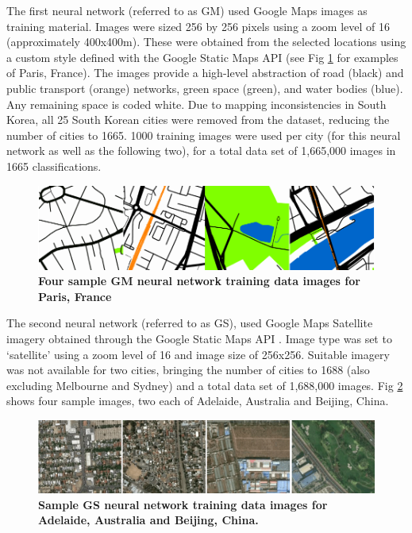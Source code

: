 \documentclass[Crown,sageh,times]{sagej}
\begin{document}
The first neural network (referred to as GM) used Google Maps images as training material. Images were sized 256 by 256 pixels using a zoom level of 16 (approximately 400x400m). These were obtained from the selected locations using a custom style defined with the Google Static Maps API \cite{GoogleStatic2017} (see Fig \ref{fig:maps} for examples of Paris, France). The images provide a high-level abstraction of road (black) and public transport (orange) networks, green space (green), and water bodies (blue). Any remaining space is coded white. Due to mapping inconsistencies in South Korea, all 25 South Korean cities were removed from the dataset, reducing the number of cities to 1665. 1000 training images were used per city (for this neural network as well as the following two), for a total data set of 1,665,000 images in 1665 classifications. 



\begin{figure}[!htbp]
    \centering    
\includegraphics[scale=1]{Images/PlosOne/Fig2.png}  
\caption{\bf Four sample GM neural network training data images for Paris, France \cite{GoogleStatic2017}}    
 \label{fig:maps}  
\end{figure} 


The second neural network (referred to as GS), used Google Maps Satellite imagery obtained through the Google Static Maps API \cite{GoogleStatic2017}. Image type was set to `satellite' using a zoom level of 16 and image size of 256x256. Suitable imagery was not available for two cities, bringing the number of cities to 1688 (also excluding Melbourne and Sydney) and a total data set of 1,688,000 images. Fig \ref{fig:satbeiade} shows four sample images, two each of Adelaide, Australia and Beijing, China. 




\begin{figure}[!htbp]
\centering 
\includegraphics[scale=1]{Images/PlosOne/Fig3.png}     
\caption{\bf Sample GS neural network training data images for Adelaide, Australia and Beijing, China. \cite{GoogleStatic2017}}    
 \label{fig:satbeiade}  
\end{figure} 
\end{document}

